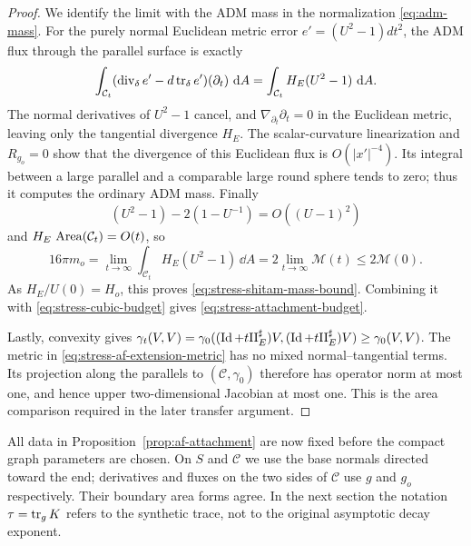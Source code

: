 \begin{proof}
We identify the limit with the ADM mass in the normalization
\eqref{eq:adm-mass}.  For the purely normal Euclidean metric error
$e'=(U^2-1)dt^2$, the ADM flux through the parallel surface is exactly
\[
 \int_{\mathcal C_t}
   (\operatorname{div}_\delta e'-d\operatorname{tr}_\delta e')(\partial_t)\,\mathop{}\!\mathrm d A
 =\int_{\mathcal C_t}H_E(U^2-1)\,\mathop{}\!\mathrm d A.
\]
The normal derivatives of $U^2-1$ cancel, and
$\nabla_{\partial_t}\partial_t=0$ in the Euclidean metric, leaving
only the tangential divergence $H_E$.  The scalar-curvature
linearization and $R_{g_o}=0$ show that the divergence of this
Euclidean flux is $O(|x'|^{-4})$.  Its integral between a large
parallel and a comparable large round sphere tends to zero; thus
it computes the ordinary ADM mass.  Finally
\[
 (U^2-1)-2(1-U^{-1})=O((U-1)^2)
\]
and $H_E\,\operatorname{Area}(\mathcal C_t)=O(t)$, so
\begin{equation}
 16\pi m_o
 =\lim_{t\to\infty}\int_{\mathcal C_t}H_E(U^2-1)\,\dd A
 =2\lim_{t\to\infty}\mathcal M(t)
 \le2\mathcal M(0).
 \label{eq:stress-adm-identification}
\end{equation}
As $H_E/U(0)=H_o$, this proves
\eqref{eq:stress-shitam-mass-bound}.  Combining it with
\eqref{eq:stress-cubic-budget} gives
\eqref{eq:stress-attachment-budget}.

Lastly, convexity gives
$\gamma_t(V,V)=\gamma_0((\operatorname{Id}+t\mathrm{II}_E^{\sharp})V,
(\operatorname{Id}+t\mathrm{II}_E^{\sharp})V)\ge\gamma_0(V,V)$.
The metric in \eqref{eq:stress-af-extension-metric} has no mixed
normal--tangential terms.  Its projection along the parallels to
$(\mathcal C,\gamma_0)$ therefore has operator norm at most one,
and hence upper two-dimensional Jacobian at most one.  This is
the area comparison required in the later transfer argument.
\end{proof}

All data in Proposition~\ref{prop:af-attachment} are now fixed before
the compact graph parameters are chosen.  On $S$ and $\mathcal C$
we use the base normals directed toward the end; derivatives and
fluxes on the two sides of $\mathcal C$ use $g$ and $g_o$ respectively.
Their boundary area forms agree.  In the next section the notation
$\tau=\operatorname{tr}_gK$ refers to the synthetic trace, not to the original
asymptotic decay exponent.
